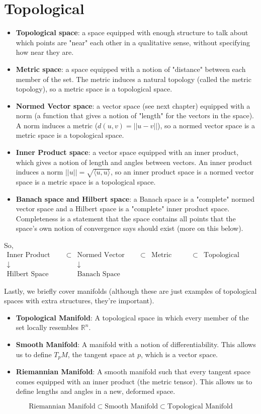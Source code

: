 \section{Topological}
\begin{itemize}
	\item\textbf{Topological space}: a space equipped with enough structure to talk about which points are "near" each other in a qualitative sense, without specifying how near they are.
	\item\textbf{Metric space}: a space equipped with a notion of "distance" between each member of the set. The metric induces a natural topology (called the metric topology), so a metric space is a topological space.
	\item\textbf{Normed Vector space}: a vector space (see next chapter) equipped with a norm (a function that gives a notion of "length" for the vectors in the space). A norm induces a metric ($d(u, v) = ||u-v||$), so a normed vector space is a metric space is a topological space.
	\item\textbf{Inner Product space}: a vector space equipped with an inner product, which gives a notion of length and angles between vectors. An inner product induces a norm $||u|| = \sqrt{\langle u, u\rangle}$, so an inner product space is a normed vector space is a metric space is a topological space.
	\item\textbf{Banach space and Hilbert space}: a Banach space is a "complete" normed vector space and a Hilbert space is a "complete" inner product space. Completeness is a statement that the space contains all points that the space's own notion of convergence says should exist (more on this below).
\end{itemize}
So, 
\begin{align*}
	\text{Inner Product space} &\subset &\text{Normed Vector Space} &\subset &\text{Metric Space} &\subset &\text{Topological Space} \\
	\downarrow & & \downarrow & & & & \\
	\text{Hilbert Space} & & \text{Banach Space} & & & & 
\end{align*}

Lastly, we briefly cover manifolds (although these are just examples of topological spaces with extra structures, they're important).
\begin{itemize}
	\item\textbf{Topological Manifold}: A topological space in which every member of the set locally resembles $\mathbb{R}^n$.
	\item\textbf{Smooth Manifold}: A manifold with a notion of differentiability. This allows us to define $T_pM$, the tangent space at $p$, which is a vector space.
	\item\textbf{Riemannian Manifold}: A smooth manifold such that every tangent space comes equipped with an inner product (the metric tensor). This allows us to define lengths and angles in a new, deformed space.
\end{itemize}

$$
	\text{Riemannian Manifold} \subset \text{Smooth Manifold} \subset \text{Topological Manifold}
$$